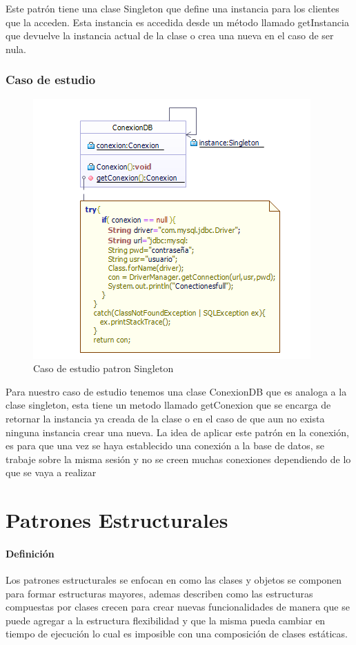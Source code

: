 Este patrón tiene una clase Singleton que define una instancia para los clientes que la acceden. Esta instancia es accedida desde un método llamado getInstancia que devuelve la instancia actual de la clase o crea una nueva en el caso de ser nula.

\subsubsection{Caso de estudio}
\begin{figure}[h!]
	\centering
	\includegraphics[width=0.7\linewidth]{arquitectura/imagenes/PatronSingeltonCasoEstudio}
	\caption{Caso de estudio patron Singleton}
\end{figure}

Para nuestro caso de estudio tenemos una clase ConexionDB que es analoga a la clase singleton, esta tiene un metodo llamado getConexion que se encarga de retornar la instancia ya creada de la clase o en el caso de que aun no exista ninguna instancia crear una nueva.\newline
La idea de  aplicar este patrón en la conexión, es para que una vez se haya establecido una conexión a la base de datos, se trabaje sobre la misma sesión y no se creen muchas conexiones dependiendo de lo que se vaya a realizar  

\newpage

\section{Patrones Estructurales}
\paragraph{Definición}
Los patrones estructurales se enfocan en como las clases y objetos se componen para formar estructuras mayores, ademas describen como las estructuras compuestas por clases crecen para crear nuevas funcionalidades de manera que se puede agregar a la estructura flexibilidad y que la misma pueda cambiar en tiempo de ejecución lo cual es imposible con una composición de clases estáticas.
